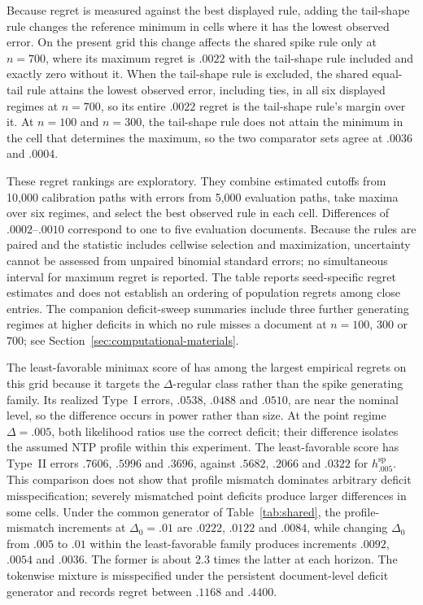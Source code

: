 \documentclass[11pt]{article}
\begin{document}
Because regret is measured against the best displayed rule, adding the tail-shape rule changes the reference minimum in cells where it has the lowest observed error.  On the present grid this change affects the shared spike rule only at $n=700$, where its maximum regret is $.0022$ with the tail-shape rule included and exactly zero without it.  When the tail-shape rule is excluded, the shared equal-tail rule attains the lowest observed error, including ties, in all six displayed regimes at $n=700$, so its entire $.0022$ regret is the tail-shape rule's margin over it.  At $n=100$ and $n=300$, the tail-shape rule does not attain the minimum in the cell that determines the maximum, so the two comparator sets agree at $.0036$ and $.0004$.

These regret rankings are exploratory.  They combine estimated cutoffs from 10,000 calibration paths with errors from 5,000 evaluation paths, take maxima over six regimes, and select the best observed rule in each cell.  Differences of $.0002$--$.0010$ correspond to one to five evaluation documents.  Because the rules are paired and the statistic includes cellwise selection and maximization, uncertainty cannot be assessed from unpaired binomial standard errors; no simultaneous interval for maximum regret is reported.  The table reports seed-specific regret estimates and does not establish an ordering of population regrets among close entries.  The companion deficit-sweep summaries include three further generating regimes at higher deficits in which no rule misses a document at $n=100$, $300$ or $700$; see Section~\ref{sec:computational-materials}.

The least-favorable minimax score of \citet{li2025framework} has among the largest empirical regrets on this grid because it targets the $\Delta$-regular class rather than the spike generating family.  Its realized Type~I errors, $.0538$, $.0488$ and $.0510$, are near the nominal level, so the difference occurs in power rather than size.  At the point regime $\Delta=.005$, both likelihood ratios use the correct deficit; their difference isolates the assumed NTP profile within this experiment.  The least-favorable score has Type~II errors $.7606$, $.5996$ and $.3696$, against $.5682$, $.2066$ and $.0322$ for $h^{\mathrm{sp}}_{.005}$.  This comparison does not show that profile mismatch dominates arbitrary deficit misspecification; severely mismatched point deficits produce larger differences in some cells.  Under the common generator of Table~\ref{tab:shared}, the profile-mismatch increments at $\Delta_0=.01$ are $.0222$, $.0122$ and $.0084$, while changing $\Delta_0$ from $.005$ to $.01$ within the least-favorable family produces increments $.0092$, $.0054$ and $.0036$.  The former is about $2.3$ times the latter at each horizon.  The tokenwise mixture is misspecified under the persistent document-level deficit generator and records regret between $.1168$ and $.4400$.
\end{document}
